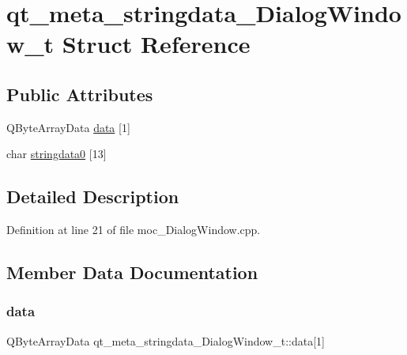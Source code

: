 \hypertarget{structqt__meta__stringdata___dialog_window__t}{}\section{qt\+\_\+meta\+\_\+stringdata\+\_\+\+Dialog\+Window\+\_\+t Struct Reference}
\label{structqt__meta__stringdata___dialog_window__t}
\subsection*{Public Attributes}
\begin{DoxyCompactItemize}
\item 
Q\+Byte\+Array\+Data \hyperlink{structqt__meta__stringdata___dialog_window__t_aa6040f5f9641bf00d019744df4b671d8}{data} \mbox{[}1\mbox{]}
\item 
char \hyperlink{structqt__meta__stringdata___dialog_window__t_a4125b0e6f5ad0b8b506d3296217a3b5b}{stringdata0} \mbox{[}13\mbox{]}
\end{DoxyCompactItemize}


\subsection{Detailed Description}


Definition at line 21 of file moc\+\_\+\+Dialog\+Window.\+cpp.



\subsection{Member Data Documentation}
\hypertarget{structqt__meta__stringdata___dialog_window__t_aa6040f5f9641bf00d019744df4b671d8}{}\label{structqt__meta__stringdata___dialog_window__t_aa6040f5f9641bf00d019744df4b671d8} 
\subsubsection{\texorpdfstring{data}{data}}
{\footnotesize\ttfamily Q\+Byte\+Array\+Data qt\+\_\+meta\+\_\+stringdata\+\_\+\+Dialog\+Window\+\_\+t\+::data\mbox{[}1\mbox{]}}



